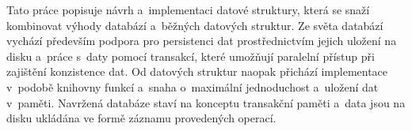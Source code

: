Tato práce popisuje návrh a~implementaci datové struktury, která
se snaží kombinovat výhody databází a~běžných datových struktur.
Ze světa databází vychází především podpora pro persistenci dat
prostřednictvím jejich uložení na disku a~práce s~daty pomocí
transakcí, které umožňují paralelní přístup při zajištění
konzistence dat. Od datových struktur naopak přichází implementace
v~podobě knihovny funkcí a~snaha o~maximální jednoduchost
a~uložení dat v~paměti.
Navržená databáze staví na konceptu transakční paměti a~data jsou
na disku ukládána ve formě záznamu provedených operací.
